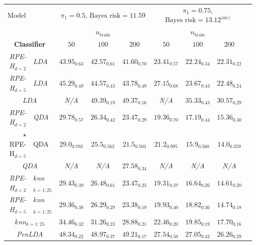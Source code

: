 \documentclass{amsart}
\providecommand{\tabularnewline}{\\}
\begin{document}
\begin{table}[p]
	\small
	\begin{centering}
		\begin{tabular}{r|l|c|c|c|c|c|c|c}
			\multicolumn{1}{r}{$\boxed{\text{Model 3}}$} & \multicolumn{1}{l}{} & \multicolumn{3}{c}{$\pi_{1}=0.5$, $\text{Bayes risk}=11.59$} & \multicolumn{3}{c}{$\pi_{1}=0.75$, $\text{Bayes risk}=13.12^\text{(sic)}$} & \tabularnewline
			\multicolumn{1}{r}{} &  & \multicolumn{3}{c|}{$n_{\mathrm{train}}$} & \multicolumn{3}{c|}{$n_{\mathrm{train}}$} & \tabularnewline
			\multicolumn{2}{c|}{\textbf{Classifier}} & $50$ & $100$ & $200$ & $50$ & $100$ & $200$ & \tabularnewline
			\hline 
			\emph{RPE-H$_{d=2}$} & \emph{LDA} & $\mathit{43.95_{0.63}}$ & $\mathit{42.57_{0.61}}$ & $\mathit{41.60_{0.70}}$ & $\mathit{23.41_{0.57}}$ & $\mathit{22.24_{0.34}}$ & $\mathit{22.31_{0.22}}$ & \tabularnewline
			\hline 
			\emph{RPE-H$_{d=5}$} & \emph{LDA} & $\mathit{45.29_{0.49}}$ & $\mathit{44.57_{0.43}}$ & $\mathit{43.78_{0.49}}$ & $\mathit{27.15_{0.68}}$ & $\mathit{23.67_{0.43}}$ & $\mathit{22.48_{0.24}}$ & \tabularnewline
			\hline 
			\multicolumn{2}{c|}{\emph{LDA}} & \emph{N/A} & $\mathit{49.39_{0.19}}$ & $\mathit{49.37_{0.16}}$ & \emph{N/A} & $\mathit{35.33_{0.43}}$ & $\mathit{30.57_{0.29}}$ & \tabularnewline
			\hline 
			\emph{RPE-H$_{d=2}$} & \emph{QDA} & $\mathit{29.78_{0.57}}$ & $\mathit{26.34_{0.42}}$ & $\mathit{23.47_{0.29}}$ & $\mathit{19.36_{0.70}}$ & $\mathit{17.19_{0.44}}$ & $\mathit{15.36_{0.30}}$ & \tabularnewline
			\hline 
			$\star$RPE-H$_{d=5}$ & QDA & $29.0_{0.703}$ & $25.5_{0.562}$ & $21.5_{0.503}$ & $21.2_{0.995}$ & $15.9_{0.560}$ & $14.0_{0.359}$ & \tabularnewline
			\hline 
			\multicolumn{2}{c|}{\emph{QDA}} & \emph{N/A} & \emph{N/A} & $\mathit{27.58_{0.34}}$ & \emph{N/A} & \emph{N/A} & \emph{N/A} & \tabularnewline
			\hline 
			\emph{RPE-H$_{d=2}$} & \emph{$k$nn$_{k=1:25}$} & $\mathit{29.43_{0.39}}$ & $\mathit{26.48_{0.61}}$ & $\mathit{23.47_{0.23}}$ & $\mathit{19.31_{0.37}}$ & $\mathit{16.64_{0.26}}$ & $\mathit{14.61_{0.20}}$ & \tabularnewline
			\hline 
			\emph{RPE-H$_{d=5}$} & \emph{$k$nn$_{k=1:25}$} & $\mathit{29.36_{0.38}}$ & $\mathit{26.29_{0.29}}$ & $\mathit{23.38_{0.19}}$ & $\mathit{19.93_{0.40}}$ & $\mathit{18.82_{0.36}}$ & $\mathit{14.74_{0.18}}$ & \tabularnewline
			\hline 
			\multicolumn{2}{c|}{\emph{$k$nn$_{k=1:25}$}} & $\mathit{34.46_{0.32}}$ & $\mathit{31.26_{0.23}}$ & $\mathit{28.88_{0.21}}$ & $\mathit{22.46_{0.20}}$ & $\mathit{19.85_{0.19}}$ & $\mathit{17.70_{0.16}}$ & \tabularnewline
			\hline 
			\hline 
			\multicolumn{2}{c|}{\emph{PenLDA}} & $\mathit{48.34_{0.22}}$ & $\mathit{48.97_{0.37}}$ & $\mathit{49.21_{0.17}}$ & $\mathit{27.54_{0.50}}$ & $\mathit{27.05_{0.42}}$ & $\mathit{26.26_{0.29}}$ & \tabularnewline

\end{tabular}
\end{centering}
\end{table}
\end{document}
